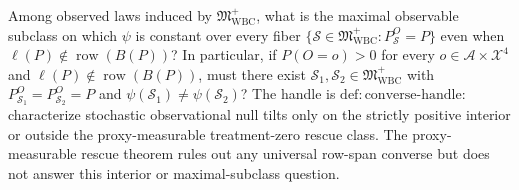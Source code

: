 Among observed laws induced by \(\mathfrak M_{\mathrm{WBC}}^{+}\), what is the maximal observable subclass on which \(\psi\) is constant over every fiber \(\{\mathcal S\in\mathfrak M_{\mathrm{WBC}}^{+}:P_{\mathcal S}^O=P\}\) even when \(\ell(P)\notin\operatorname{row}(B(P))\)? In particular, if \(P(O=o)>0\) for every \(o\in\mathcal A\times\mathcal X^4\) and \(\ell(P)\notin\operatorname{row}(B(P))\), must there exist \(\mathcal S_1,\mathcal S_2\in\mathfrak M_{\mathrm{WBC}}^{+}\) with \(P_{\mathcal S_1}^O=P_{\mathcal S_2}^O=P\) and \(\psi(\mathcal S_1)\ne\psi(\mathcal S_2)\)? The handle is \(\mathrm{def{:}converse\text{-}handle}\): characterize stochastic observational null tilts only on the strictly positive interior or outside the proxy-measurable treatment-zero rescue class. The proxy-measurable rescue theorem rules out any universal row-span converse but does not answer this interior or maximal-subclass question.